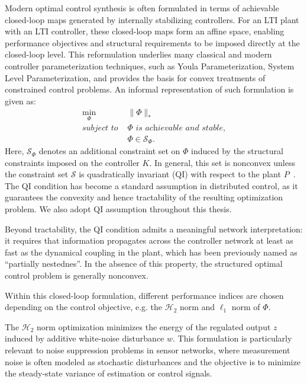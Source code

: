 Modern optimal control synthesis is often formulated in terms of achievable closed-loop maps generated by internally stabilizing controllers. For an LTI plant with an LTI controller, these closed-loop maps form an affine space, enabling performance objectives and structural requirements to be imposed directly at the closed-loop level. This reformulation underlies many classical and modern controller parameterization techniques, such as Youla Parameterization, System Level Parameterization, and provides the basis for convex treatments of constrained control problems. An informal representation of such formulation is given as:
\begin{equation}
\begin{split}
    \min_{\Phi} \quad & \|\Phi\|_* \\
    \textit{subject to } & \Phi\textit{ is achievable and stable,}\\
    & \Phi\in \mathcal{S}_\Phi.
\end{split}
\end{equation}
Here, $\mathcal{S}_\Phi$ denotes an additional constraint set on $\Phi$ induced by the structural constraints imposed on the controller $K$. In general, this set is nonconvex unless the constraint set $\mathcal{S}$ is quadratically invariant (QI) with respect to the plant $P$~\cite{SanjayLQIsufficient,LessardQI}. The QI condition has become a standard assumption in distributed control, as it guarantees the convexity and hence tractability of the resulting optimization problem. We also adopt QI assumption throughout this thesis.

Beyond tractability, the QI condition admits a meaningful network interpretation: it requires that information propagates across the controller network at least as fast as the dynamical coupling in the plant, which has been previously named as ``partially nestednes''\cite{Ho1972infostrc}. In the absence of this property, the structured optimal control problem is generally nonconvex.

Within this closed-loop formulation, different performance indices are chosen depending on the control objective, e.g. the \(\mathcal{H}_2\) norm and \(\ell_1\) norm of \(\Phi\). 

The $\mathcal{H}_2$ norm optimization minimizes the energy of the regulated output $z$ induced by additive white-noise disturbance $w$. This formulation is particularly relevant to noise suppression problems in sensor networks, where measurement noise is often modeled as stochastic disturbances and the objective is to minimize the steady-state variance of estimation or control signals.

